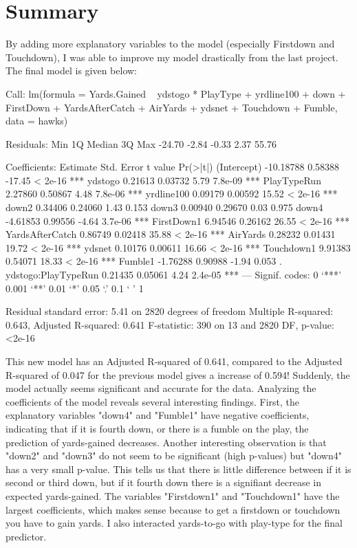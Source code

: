 \documentclass{article}
\begin{document}
\section*{Summary}

By adding more explanatory variables to the model (especially Firstdown and Touchdown), I was able to improve my model drastically from the last project. The final model is given below:


\begin{Schunk}
\begin{Soutput}
Call:
lm(formula = Yards.Gained ~ ydstogo * PlayType + yrdline100 + 
    down + FirstDown + YardsAfterCatch + AirYards + ydsnet + 
    Touchdown + Fumble, data = hawks)

Residuals:
   Min     1Q Median     3Q    Max 
-24.70  -2.84  -0.33   2.37  55.76 

Coefficients:
                     Estimate Std. Error t value Pr(>|t|)    
(Intercept)         -10.18788    0.58388  -17.45  < 2e-16 ***
ydstogo               0.21613    0.03732    5.79  7.8e-09 ***
PlayTypeRun           2.27860    0.50867    4.48  7.8e-06 ***
yrdline100            0.09179    0.00592   15.52  < 2e-16 ***
down2                 0.34406    0.24060    1.43    0.153    
down3                 0.00940    0.29670    0.03    0.975    
down4                -4.61853    0.99556   -4.64  3.7e-06 ***
FirstDown1            6.94546    0.26162   26.55  < 2e-16 ***
YardsAfterCatch       0.86749    0.02418   35.88  < 2e-16 ***
AirYards              0.28232    0.01431   19.72  < 2e-16 ***
ydsnet                0.10176    0.00611   16.66  < 2e-16 ***
Touchdown1            9.91383    0.54071   18.33  < 2e-16 ***
Fumble1              -1.76288    0.90988   -1.94    0.053 .  
ydstogo:PlayTypeRun   0.21435    0.05061    4.24  2.4e-05 ***
---
Signif. codes:  0 ‘***’ 0.001 ‘**’ 0.01 ‘*’ 0.05 ‘.’ 0.1 ‘ ’ 1

Residual standard error: 5.41 on 2820 degrees of freedom
Multiple R-squared:  0.643,	Adjusted R-squared:  0.641 
F-statistic:  390 on 13 and 2820 DF,  p-value: <2e-16
\end{Soutput}
\end{Schunk}
  
This new model has an Adjusted R-squared of 0.641, compared to the Adjusted R-squared of 0.047 for the previous model gives a increase of 0.594! Suddenly, the model actually seems significant and accurate for the data. Analyzing the coefficients of the model reveals several interesting findings. First, the explanatory variables "down4" and "Fumble1" have negative coefficients, indicating that if it is fourth down, or there is a fumble on the play, the prediction of yards-gained decreases. Another interesting observation is that "down2" and "down3" do not seem to be significant (high p-values) but "down4" has a very small p-value. This tells us that there is little difference between if it is second or third down, but if it fourth down there is a signifiant decrease in expected yards-gained. The variables "Firstdown1" and "Touchdown1" have the largest coefficients, which makes sense because to get a firstdown or touchdown you have to gain yards. I also interacted yards-to-go with play-type for the final predictor. 
\end{document}
